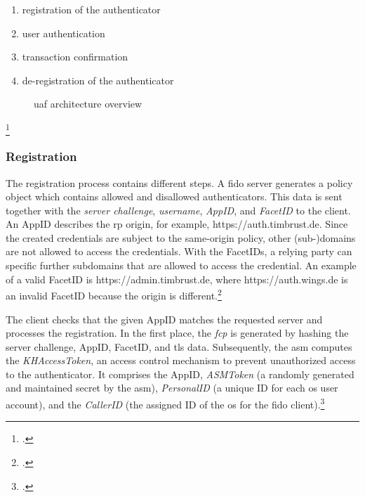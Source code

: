 \begin{enumerate}
	\item registration of the authenticator
	\item user authentication
	\item transaction confirmation
	\item de-registration of the authenticator
\end{enumerate}

\begin{figure}[hbt]
	\centering
	
	\caption[\gls{uaf} architecture overview]{\gls{uaf} architecture overview\footnotemark}
	\label{fig:uaf_architecture}
\end{figure}
\footcitetext[Source: diagram by author, based on][4]{uaf-overview}

\subsubsection{Registration}

The registration process contains different steps. A \gls{fido} server generates a policy object which contains allowed and disallowed authenticators. This data is sent together with the \textit{server challenge}, \textit{username}, \textit{AppID}, and \textit{FacetID} to the client. An AppID describes the \gls{rp} origin, for example, \frqq https://auth.timbrust.de\flqq. Since the created credentials are subject to the same-origin policy, other (sub-)domains are not allowed to access the credentials. With the FacetIDs, a relying party can specific further subdomains that are allowed to access the credential. An example of a valid FacetID is \frqq https://admin.timbrust.de\flqq, where \frqq https://auth.wings.de\flqq{} is an invalid FacetID because the origin is different.\footcites[See][131--132]{10.1007/978-3-319-67639-5_11}[See][17--19]{uaf-protocol}[See][3--4]{uaf-appid-facets}

The client checks that the given AppID matches the requested server and processes the registration. In the first place, the \textit{\gls{fcp}} is generated by hashing the server challenge, AppID, FacetID, and \gls{tls} data. Subsequently, the \gls{asm} computes the \textit{KHAccessToken}, an access control mechanism to prevent unauthorized access to the authenticator. It comprises the AppID, \textit{ASMToken} (a randomly generated and maintained secret by the \gls{asm}), \textit{PersonalID} (a unique ID for each \gls{os} user account), and the \textit{CallerID} (the assigned ID of the \gls{os} for the \gls{fido} client).\footcites[See][131--132]{10.1007/978-3-319-67639-5_11}[See][17--19]{uaf-protocol}

